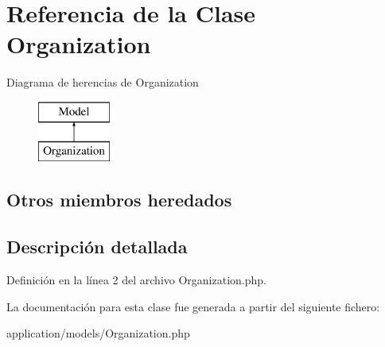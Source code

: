 \hypertarget{class_organization}{}\section{Referencia de la Clase Organization}
\label{class_organization}
Diagrama de herencias de Organization\begin{figure}[H]
\begin{center}
\leavevmode
\includegraphics[height=2.000000cm]{class_organization}
\end{center}
\end{figure}
\subsection*{Otros miembros heredados}


\subsection{Descripción detallada}


Definición en la línea 2 del archivo Organization.\+php.



La documentación para esta clase fue generada a partir del siguiente fichero\+:\begin{DoxyCompactItemize}
\item 
application/models/Organization.\+php\end{DoxyCompactItemize}
